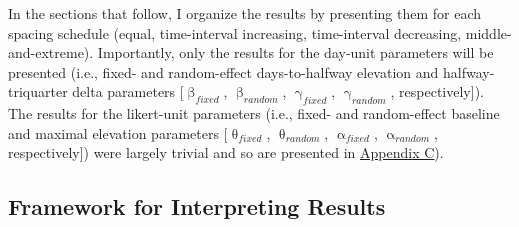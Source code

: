 \documentclass[
12pt, %
twoside,
english]{guelphthesis}
\theoremstyle{definition}
\theoremstyle{definition}
\theoremstyle{definition}
\theoremstyle{definition}
\theoremstyle{remark}
\begin{document}
In the sections that follow, I organize the results by presenting them for each spacing schedule (equal, time-interval increasing, time-interval decreasing, middle-and-extreme). Importantly, only the results for the day-unit parameters will be presented (i.e., fixed- and random-effect days-to-halfway elevation and halfway-triquarter delta parameters {[}\(\upbeta_{fixed}\), \(\upbeta_{random}\), \(\upgamma_{fixed}\), \(\upgamma_{random}\), respectively{]}). The results for the likert-unit parameters (i.e., fixed- and random-effect baseline and maximal elevation parameters {[}\(\uptheta_{fixed}\), \(\uptheta_{random}\), \(\upalpha_{fixed}\), \(\upalpha_{random}\), respectively{]}) were largely trivial and so are presented in \protect\hyperlink{appendix-c}{Appendix C}).

\hypertarget{framework-for-interpreting-results-1}{%
\subsection{Framework for Interpreting Results}\label{framework-for-interpreting-results-1}}
\end{document}
